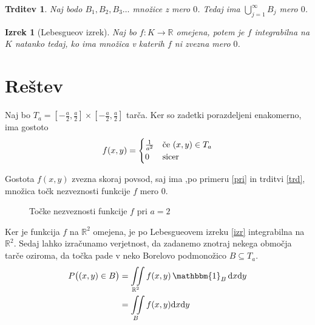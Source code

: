 \documentclass{amsart}
\newcommand{\R}{\mathbb{R}}
\theoremstyle{definition} %
\theoremstyle{plain} %
\newtheorem{izrek}[definicija]{Izrek}
\newtheorem{trditev}[definicija]{Trditev}
\newtheorem{posledica}[definicija]{Posledica}
\begin{document}
\begin{trditev}\label{trd}
    Naj bodo $B_1, B_2, B_3 \ldots $ množice z mero $0$. Tedaj ima $\bigcup_{j=1}^{\infty} B_{j}$ mero $0$.
\end{trditev}


\begin{izrek}[Lebesgueov izrek]\label{izr}
    Naj bo $f \colon K \to \R $ omejena, potem je $f$ integrabilna na $K$ natanko tedaj, ko ima množica
    v katerih $f$ ni zvezna mero $0$.
\end{izrek}

\pagebreak

\section{Reštev}

Naj bo $T_a = \left[ -\frac{a}{2} , \frac{a}{2}\right]\times\left[-\frac{a}{2},\frac{a}{2}\right]$
tarča. Ker so zadetki porazdeljeni enakomerno, ima gostoto
\begin{equation*}
    f(x,y) = 
    \begin{cases}
        \frac{1}{a^2} & \text{če $ (x,y) \in T_a  $} \\
        0 & \text{sicer}
    \end{cases}
\end{equation*}

Gostota $f(x,y)$ zvezna skoraj povsod, saj ima ,po primeru \eqref{pri} in trditvi 
\eqref{trd}, množica točk nezveznosti funkcije $f$ mero $0$.
\begin{figure}[!ht]
    \centering
    \caption{Točke nezveznosti funkcije $f$ pri $a=2$}
\end{figure}

Ker je funkcija $f$ na $\R^2$ omejena, je po Lebesgueovem izreku \eqref{izr} integrabilna na $\R^2$.
Sedaj lahko izračunamo verjetnost, da zadanemo znotraj nekega območja tarče oziroma, da točka
pade v neko Borelovo podmonožico $B \subseteq T_a$.
\begin{align*}
    P\big((x,y) \in B\big)
    &= \iint\limits_{\R^2} f(x,y) \, \mathbbm{1}_{B} \, \mathrm{d}x\mathrm{d}y \\
    &= \iint\limits_{B} f(x,y) \mathrm{d}x\mathrm{d}y
\end{align*}
\end{document}
